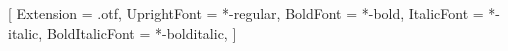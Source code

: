 
\usepackage{arxiv}

\setmainfont{texgyretermes}[
  Extension      = .otf,
  UprightFont    = *-regular,
  BoldFont       = *-bold,
  ItalicFont     = *-italic,
  BoldItalicFont = *-bolditalic,
]

\renewcommand{\undertitle}{}
\renewcommand{\headeright}{}

%
\usepackage[numbers,sort&compress]{natbib}

\usepackage{newunicodechar}


